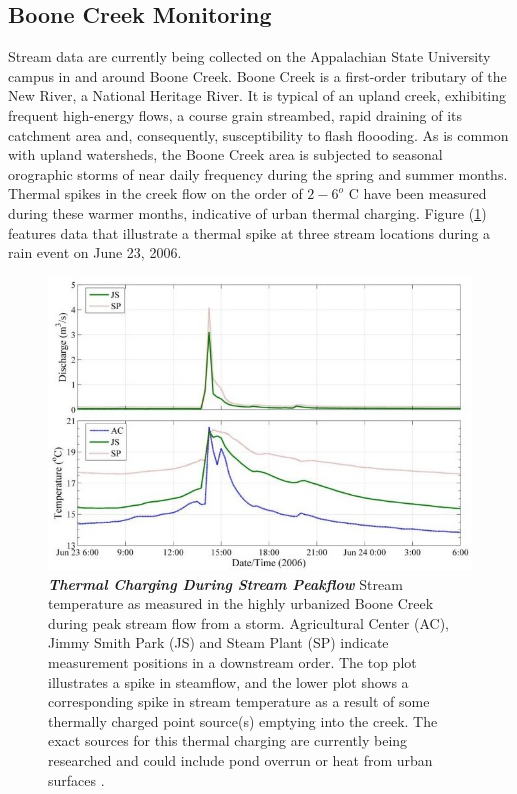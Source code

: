 \subsection{Boone Creek Monitoring}
Stream data are currently being collected on the Appalachian State University campus in and around Boone Creek. Boone Creek is a first-order tributary of the New River, a National Heritage River. It is typical of an upland creek, exhibiting frequent high-energy flows, a course grain streambed, rapid draining of its catchment area and, consequently, susceptibility to flash floooding. As is common with upland watersheds, the Boone Creek area is subjected to seasonal orographic storms of near daily frequency during the spring and summer months. Thermal spikes in the creek flow on the order of $2-6^{o}$ C have been measured during these warmer months, indicative of urban thermal charging. \linebreak Figure (\ref{kcPeak}) features data that illustrate a thermal spike at three stream locations during a rain event on June 23, 2006.

\begin{figure}[h!]
\begin{center}
 \includegraphics[scale=0.7]{kc_peak.jpg}
\caption[Boone Creek Thermal Charging]{\textbf{\emph{Thermal Charging During Stream Peakflow}} Stream temperature as measured in the highly urbanized Boone Creek during peak stream flow from a storm. Agricultural Center (AC), Jimmy Smith Park (JS) and Steam Plant (SP) indicate measurement positions in a downstream order. The top plot illustrates a spike in steamflow, and the lower plot shows a corresponding spike in stream temperature as a result of some thermally charged point source(s) emptying into the creek. The exact sources for this thermal charging are currently being researched and could include pond overrun or heat from urban surfaces \citep{krautBASE}.\label{kcPeak}}
\end{center}
\end{figure}

